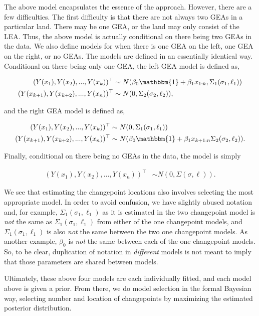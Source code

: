 \documentclass[12pt]{article}
\begin{document}
The above model encapsulates the essence of the approach. However, there
are a few difficulties. The first difficulty is that there are not
always two GEAs in a particular land. There may be one GEA, or the land
may only consist of the LEA. Thus, the above model is actually
conditional on there being two GEAs in the data. We also define models
for when there is one GEA on the left, one GEA on the right, or no GEAs.
The models are defined in an essentially identical way. Conditional on
there being only one GEA, the left GEA model is defined as,

\begin{align}
(Y(x_1), Y(x_2), ..., Y(x_{k}))^{\top} &\sim N(\beta_{0}\mathbbm{1} + \beta_{1} x_{1:k}, \Sigma_1(\sigma_1, \ell_1)) \\
(Y(x_{k + 1}), Y(x_{k + 2}), ..., Y(x_{n}))^{\top} &\sim N(0, \Sigma_2(\sigma_2, \ell_2)),
\end{align}

\noindent and the right GEA model is defined as,

\begin{align}
(Y(x_{1}), Y(x_{2}), ..., Y(x_{k}))^{\top} &\sim N(0, \Sigma_1(\sigma_1, \ell_1)) \\ 
(Y(x_{k + 1}), Y(x_{k + 2}), ..., Y(x_n))^{\top} &\sim N(\beta_{0}\mathbbm{1} + \beta_{1} x_{k + 1:n} \Sigma_2(\sigma_2, \ell_2)).
\end{align}

\noindent Finally, conditional on there being no GEAs in the data, the
model is simply

\begin{align}
(Y(x_{1}), Y(x_{2}), ..., Y(x_{n}))^{\top} &\sim N(0, \Sigma(\sigma, \ell)).
\end{align}

We see that estimating the changepoint locations also involves selecting
the most appropriate model. In order to avoid confusion, we have
slightly abused notation and, for example,
\(\Sigma_1(\sigma_1, \ell_1)\) as it is estimated in the two changepoint
model is \emph{not} the same as \(\Sigma_1(\sigma_1, \ell_1)\) from
either of the one changepoint models, and \(\Sigma_1(\sigma_1, \ell_1)\)
is also \emph{not} the same between the two one changepoint models. As
another example, \(\beta_0\) is \emph{not} the same between each of the
one changepoint models. So, to be clear, duplication of notation in
\emph{different} models is not meant to imply that those parameters are
shared between models.

Ultimately, these above four models are each individually fitted, and
each model above is given a prior. From there, we do model selection in
the formal Bayesian way, selecting number and location of changepoints
by maximizing the estimated posterior distribution.
\end{document}
